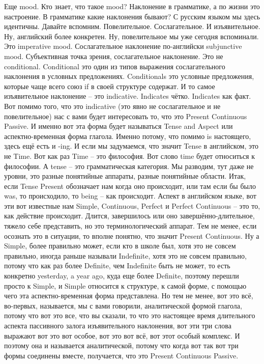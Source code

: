 \documentclass[main.tex]{subfiles}
\begin{document}
Еще mood.
Кто знает, что такое mood? Наклонение в грамматике, а по жизни это настроение.
В грамматике какие наклонения бывают?
С русским языком мы здесь идентичны.
Давайте вспомним.
Повелительное.
Сослагательное.
И изъявительное.
Ну, английский более конкретен.
Ну, повелительное мы уже сегодня вспоминали.
Это imperative mood.
Сослагательное наклонение по-английски subjunctive mood.
Субъективная точка зрения, сослагательное наклонение.
Это не conditional.
Conditional это один из типов выражения сослагательного наклонения в условных предложениях.
Conditionals это условные предложения, которые чаще всего союз if в своей структуре содержат.
И то самое изъявительное наклонение -- это indicative.
Indicates чётко.
Indicates как факт.
Вот помимо того, что это indicative (это явно не сослагательное и не повелительное) нас с вами будет интересовать то, что это Present Continuous Passive.
И именно вот эта форма будет называться Tense and Aspect или аспектно-временная форма глагола.
Именно потому, что помимо is настоящего, здесь ещё есть и -ing.
И если мы задумаемся, что значит Tense в английском, это не Time.
Вот как раз Time -- это философия.
Вот слово time будет относиться к философии.
А tense -- это грамматическая категория.
Мы разводим, тут даже не уровни, это разные понятийные аппараты, разные понятийные области.
Итак, если Tense Present обозначает нам когда оно происходит, или там если бы было was, то происходило, то being -- как происходит.
Аспект в английском языке, вот эти вот известные нам Simple, Continuous, Perfect и Perfect Continuous -- это то, как действие происходит.
Длится, завершилось или оно завершённо-длительное, тяжело себе представить, но это терминологический аппарат.
Тем не менее, если осознать это в ситуации, то вполне понятно, что значит Present Continuous.
Ну а Simple, более правильно может, если кто в школе был, хотя это не совсем правильно, иногда раньше называли Indefinite, хотя это не совсем правильно, потому что как раз более Definite, чем Indefinite быть не может, то есть конкретно yesterday, a year ago, куда еще более Definite, поэтому перешли просто к Simple, и Simple относится к структуре, к самой форме, с помощью чего эта аспектно-временная форма представлена.
Но тем не менее, вот это всё, во-первых, называется, мы с вами говорили, аналитической формой глагола, потому что вот это все, что вы сказали, то что это настоящее время длительного аспекта пассивного залога изъявительного наклонения, вот эти три слова выражают вот это вот особое, вот это вот всё, вот этот особый комплекс.
И поэтому она и называется аналитической, потому что когда вот так вот три формы соединены вместе, получается, что это Present Continuous Passive.
\end{document}
